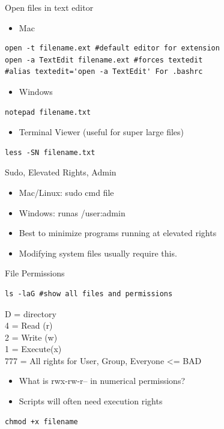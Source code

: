 \documentclass[presentation]{beamer}
\begin{document}
\begin{frame}[fragile,label=sec-3-0-3]{Open files in text editor}
 \begin{itemize}
\item Mac
\end{itemize}
\lstset{numbers=left,language=sh,label= ,caption= }
\begin{lstlisting}
open -t filename.ext #default editor for extension
open -a TextEdit filename.ext #forces textedit
#alias textedit='open -a TextEdit' For .bashrc
\end{lstlisting}
\begin{itemize}
\item Windows
\end{itemize}
\lstset{numbers=left,language=sh,label= ,caption= }
\begin{lstlisting}
notepad filename.txt
\end{lstlisting}
\begin{itemize}
\item Terminal Viewer (useful for super large files)
\end{itemize}
\lstset{numbers=left,language=sh,label= ,caption= }
\begin{lstlisting}
less -SN filename.txt
\end{lstlisting}
\end{frame}


\begin{frame}[label=sec-3-0-4]{Sudo, Elevated Rights, Admin}
\begin{itemize}
\item Mac/Linux: sudo cmd file
\item Windows: runas /user:admin
\item Best to minimize programs running at elevated rights
\item Modifying system files usually require this.
\end{itemize}
\end{frame}


\begin{frame}[fragile,label=sec-3-0-5]{File Permissions}
 \lstset{numbers=left,language=sh,label= ,caption= }
\begin{lstlisting}
ls -laG #show all files and permissions
\end{lstlisting}

D = directory \\
4 = Read (r) \\
2 = Write (w) \\
1 = Execute(x) \\
777 = All rights for User, Group, Everyone <= BAD

\begin{itemize}
\item What is rwx-rw-r-- in numerical permissions?

\item Scripts will often need execution rights
\end{itemize}
\lstset{numbers=left,language=sh,label= ,caption= }
\begin{lstlisting}
chmod +x filename
\end{lstlisting}
\end{frame}
\end{document}
